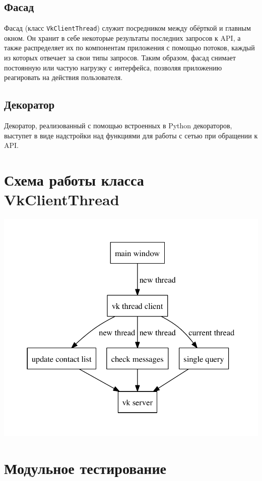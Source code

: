 \documentclass[12pt]{article}
\begin{document}
\subsection{Фасад}
Фасад (класс {\tt VkClientThread}) служит посредником между обёрткой и главным окном. Он хранит в себе некоторые результаты последних запросов к API, а также распределяет их по компонентам приложения с помощью потоков, каждый из которых отвечает за свои типы запросов. Таким образом, фасад снимает постоянную или частую нагрузку с интерфейса, позволяя приложению реагировать на действия пользователя.

\subsection{Декоратор}
Декоратор, реализованный с помощью встроенных в Python декораторов, выступет в виде надстройки над функциями для работы с сетью при обращении к API.



\section{Схема работы класса VkClientThread}
\includegraphics{./diag/work_logic.pdf}



\newpage
\section{Модульное тестирование}
\end{document}

